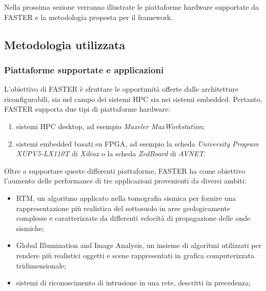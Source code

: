 Nella prossima sezione verranno illustrate le piattaforme hardware supportate 
da \ac{FASTER} e la metodologia proposta per il framework.




\subsection{Metodologia utilizzata}
\label{sec:fasterMetodologia}

\subsubsection{Piattaforme supportate e applicazioni}
L'obiettivo di \ac{FASTER} è sfruttare le opportunità offerte dalle 
architetture riconfigurabili, sia nel campo dei sistemi \ac{HPC} sia nei 
sistemi embedded. Pertanto, \ac{FASTER} supporta due tipi di piattaforme 
hardware:
\begin{enumerate}
 \item sistemi \ac{HPC} desktop, ad esempio \emph{Maxeler MaxWorkstation};%
 \item sistemi embedded basati su \ac{FPGA}, ad esempio la 
scheda \emph{University Program XUPV5-LX110T} di \emph{Xilinx} o la scheda 
\emph{ZedBoard} di \emph{AVNET}.
\end{enumerate}

Oltre a supportare queste differenti piattaforme, \ac{FASTER} ha come obiettivo 
l'aumento delle performance di tre applicazioni provenienti da diversi ambiti:
\begin{itemize}
 \item \acf{RTM}, un algoritmo applicato nella tomografia sismica per 
fornire una rappresentazione più realistica del sottosuolo in aree 
geologicamente complesse e caratterizzate da differenti velocità di 
propagazione delle onde sismiche;
 \item Global Illumination and Image Analysis, un insieme di algoritmi 
utilizzati per rendere più realistici oggetti e scene rappresentati in grafica 
computerizzata tridimensionale;
 \item sistemi di riconoscimento di intrusione in una rete, descritti in 
precedenza;
\end{itemize}


